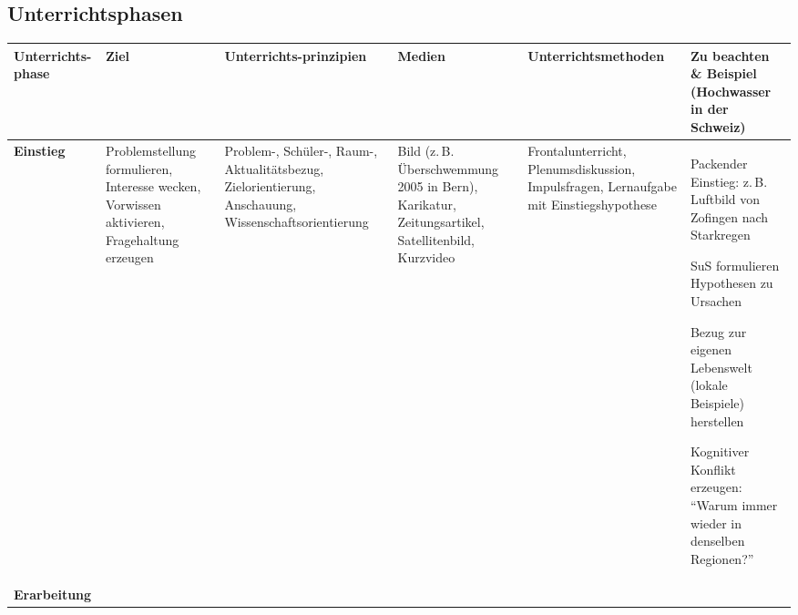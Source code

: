 \begin{landscape}
  \section{Unterrichtsphasen}
  \begin{longtable}{>{\raggedright\arraybackslash}p{2.5cm}
    >{\raggedright\arraybackslash}p{3.2cm}
    >{\raggedright\arraybackslash}p{3.5cm}
    >{\raggedright\arraybackslash}p{3.5cm}
    >{\raggedright\arraybackslash}p{3.5cm}
    >{\raggedright\arraybackslash}p{5cm}}
    \toprule
    \textbf{Unterrichts-\newline phase}                                                                  &
    \textbf{Ziel}                                                                                        &
    \textbf{Unterrichts-prinzipien}                                                                      &
    \textbf{Medien}                                                                                      &
    \textbf{Unterrichtsmethoden}                                                                         &
    \textbf{Zu beachten \& Beispiel (Hochwasser in der Schweiz)}                                           \\
    \midrule
    \textbf{Einstieg}                                                                                    &
    Problemstellung formulieren, Interesse wecken, Vorwissen aktivieren, Fragehaltung erzeugen           &
    Problem-, Schüler-, Raum-, Aktualitätsbezug, Zielorientierung, Anschauung, Wissenschaftsorientierung &
    Bild (z.\,B. Überschwemmung 2005 in Bern), Karikatur, Zeitungsartikel, Satellitenbild, Kurzvideo     &
    Frontalunterricht, Plenumsdiskussion, Impulsfragen, Lernaufgabe mit Einstiegshypothese               &
    \begin{itemize*}
      \item Packender Einstieg: z.\,B. Luftbild von Zofingen nach Starkregen
      \item SuS formulieren Hypothesen zu Ursachen
      \item Bezug zur eigenen Lebenswelt (lokale Beispiele) herstellen
      \item Kognitiver Konflikt erzeugen: \enquote{Warum immer wieder in denselben Regionen?}
    \end{itemize*}                       \\
    \midrule
    \textbf{Erarbeitung}                                                                                 &

\end{longtable}
\end{landscape}
